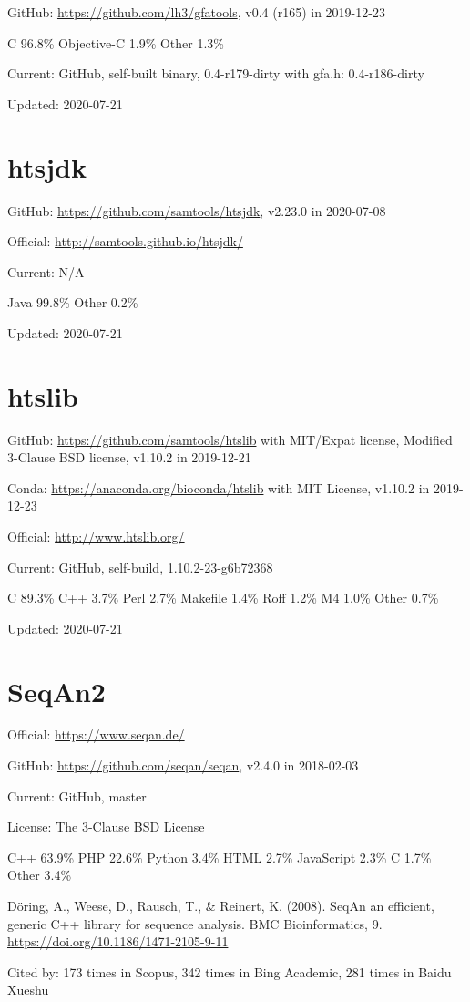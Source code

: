 \documentclass[]{article}
\newcommand{\cb}[3]{\par Cited by: {\color{blue}\Huge #1} times in Scopus, {\color{blue}\Huge #2} times in Bing Academic, {\color{blue}\Huge #3} times in Baidu Xueshu}
\begin{document}
GitHub: \url{https://github.com/lh3/gfatools}, v0.4 (r165) in 2019-12-23

C 96.8\% Objective-C 1.9\% Other 1.3\%

Current: GitHub, self-built binary, 0.4-r179-dirty with gfa.h: 0.4-r186-dirty

Updated: 2020-07-21

\section{htsjdk}

GitHub: \url{https://github.com/samtools/htsjdk}, v2.23.0 in 2020-07-08

Official: \url{http://samtools.github.io/htsjdk/}

Current: N/A

Java 99.8\% Other 0.2\%

Updated: 2020-07-21

\section{htslib}

GitHub: \url{https://github.com/samtools/htslib} with MIT/Expat license, Modified 3-Clause BSD license, v1.10.2 in 2019-12-21 

Conda: \url{https://anaconda.org/bioconda/htslib} with MIT License, v1.10.2 in 2019-12-23

Official: \url{http://www.htslib.org/}

Current: GitHub, self-build,  1.10.2-23-g6b72368

C 89.3\% C++ 3.7\% Perl 2.7\% Makefile 1.4\% Roff 1.2\% M4 1.0\% Other 0.7\%

Updated: 2020-07-21

\section{SeqAn2}

Official: \url{https://www.seqan.de/}

GitHub: \url{https://github.com/seqan/seqan}, v2.4.0 in 2018-02-03

Current: GitHub, master

License: The 3-Clause BSD License

C++ 63.9\% PHP 22.6\% Python 3.4\% HTML 2.7\% JavaScript 2.3\% C 1.7\% Other 3.4\%

Döring, A., Weese, D., Rausch, T., \& Reinert, K. (2008). SeqAn an efficient, generic C++ library for sequence analysis. BMC Bioinformatics, 9. \url{https://doi.org/10.1186/1471-2105-9-11} \cb{173}{342}{281}
\end{document}
